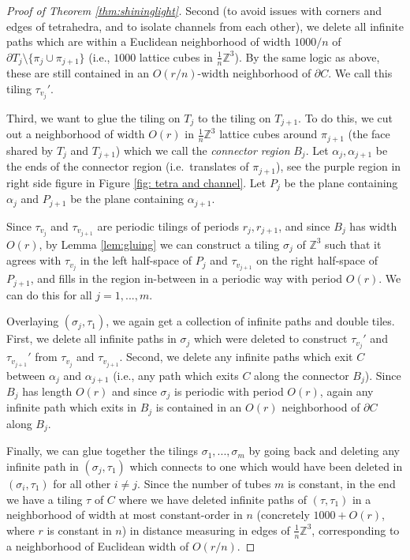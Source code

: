 \documentclass[11pt]{article}
\theoremstyle{remark}
\theoremstyle{definition}
\newcommand{\m}[1]{\mathbb{#1}}
\begin{document}
\begin{proof}[Proof of Theorem \ref{thm:shininglight}]
Second (to avoid issues with corners and edges of tetrahedra, and to isolate channels from each other), we delete all infinite paths which are within a Euclidean neighborhood of width $1000/n$ of $\partial T_j\setminus \{\pi_j\cup \pi_{j+1}\}$ (i.e., $1000$ lattice cubes in $\frac{1}{n} \m Z^3$). By the same logic as above, these are still contained in an $O(r/n)$-width neighborhood of $\partial C$. We call this tiling $\tau_{v_j}'$.

Third, we want to glue the tiling on $T_j$ to the tiling on $T_{j+1}$. To do this, we cut out a neighborhood of width $O(r)$ in $\frac{1}{n}\m Z^3$ lattice cubes around $\pi_{j+1}$ (the face shared by $T_j$ and $T_{j+1}$) which we call the \textit{connector region} $B_j$. Let $\alpha_j, \alpha_{j+1}$ be the ends of the connector region (i.e.\ translates of $\pi_{j+1}$), see the purple region in right side figure in Figure \ref{fig: tetra and channel}. Let $P_j$ be the plane containing $\alpha_j$ and $P_{j+1}$ be the plane containing $\alpha_{j+1}$. 

Since $\tau_{v_j}$ and $\tau_{v_{j+1}}$ are periodic tilings of periods $r_j, r_{j+1}$, and since $B_j$ has width $O(r)$, by Lemma \ref{lem:gluing} we can construct a tiling $\sigma_j$ of $\m Z^3$ such that it agrees with $\tau_{v_j}$ in the left half-space of $P_j$ and $\tau_{v_{j+1}}$ on the right half-space of $P_{j+1}$, and fills in the region in-between in a periodic way with period $O(r)$. We can do this for all $j=1,...,m$. 

Overlaying $(\sigma_j,\tau_1)$, we again get a collection of infinite paths and double tiles. First, we delete all infinite paths in $\sigma_j$ which were deleted to construct $\tau_{v_j}'$ and $\tau_{v_{j+1}}'$ from $\tau_{v_j}$ and $\tau_{v_{j+1}}$. Second, we delete any infinite paths which exit $C$ between $\alpha_j$ and $\alpha_{j+1}$ (i.e., any path which exits $C$ along the connector $B_j$). Since $B_j$ has length $O(r)$ and since $\sigma_j$ is periodic with period $O(r)$, again any infinite path which exits in $B_j$ is contained in an $O(r)$ neighborhood of $\partial C$ along $B_j$. 

Finally, we can glue together the tilings $\sigma_1,...,\sigma_m$ by going back and deleting any infinite path in $(\sigma_j,\tau_1)$ which connects to one which would have been deleted in $(\sigma_i,\tau_1)$ for all other $i\neq j$. Since the number of tubes $m$ is constant, in the end we have a tiling $\tau$ of $C$ where we have deleted infinite paths of $(\tau,\tau_1)$ in a neighborhood of width at most constant-order in $n$ (concretely $1000 + O(r)$, where $r$ is constant in $n$) in distance measuring in edges of $\frac{1}{n} \m Z^3$, corresponding to a neighborhood of Euclidean width of $O(r/n)$.


\end{proof}
\end{document}
